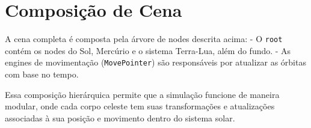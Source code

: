\documentclass[11pt, a4paper]{article}
\begin{document}
\section {Composição de Cena}

A cena completa é composta pela árvore de nodes descrita acima:
- O \texttt{root} contém os nodes do Sol, Mercúrio e o sistema Terra-Lua, além 
do fundo.
- As engines de movimentação (\texttt{MovePointer}) são responsáveis por 
atualizar as órbitas com base no tempo.

Essa composição hierárquica permite que a simulação funcione de maneira modular, 
onde cada corpo celeste tem suas transformações e atualizações associadas à sua 
posição e movimento dentro do sistema solar.
\end{document}
